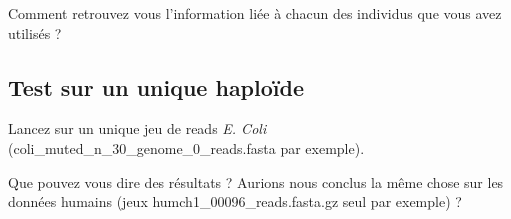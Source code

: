 \qu Comment retrouvez vous l'information liée à chacun des individus que vous avez utilisés ? 


\subsection*{Test sur un unique haploïde}
\qu {} Lancez \discopp sur un unique jeu de reads \emph{E. Coli} (coli\_muted\_n\_30\_genome\_0\_reads.fasta par exemple).

\qu Que pouvez vous dire des résultats ? Aurions nous conclus la même chose sur les données humains (jeux humch1\_00096\_reads.fasta.gz seul par exemple) ?





